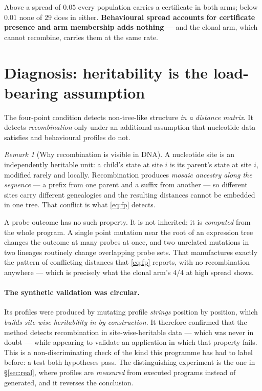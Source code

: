 \documentclass[11pt,a4paper]{article}
\theoremstyle{definition}
\theoremstyle{remark}
\newtheorem{remark}{Remark}[section]
\begin{document}
Above a spread of $0.05$ every population carries a certificate in both arms;
below $0.01$ none of $29$ does in either. \textbf{Behavioural spread accounts for
certificate presence and arm membership adds nothing} --- and the clonal arm,
which cannot recombine, carries them at the same rate.

\section{Diagnosis: heritability is the load-bearing assumption}\label{sec:diagnosis}

The four-point condition detects non-tree-like structure \emph{in a distance
matrix}. It detects \emph{recombination} only under an additional assumption that
nucleotide data satisfies and behavioural profiles do not.

\begin{remark}[Why recombination is visible in DNA]
A nucleotide site is an independently heritable unit: a child's state at site $i$
is its parent's state at site $i$, modified rarely and locally. Recombination
produces \emph{mosaic ancestry along the sequence} --- a prefix from one parent
and a suffix from another --- so different sites carry different genealogies and
the resulting distances cannot be embedded in one tree. That conflict is what
\eqref{eq:fp} detects.
\end{remark}

A probe outcome has no such property. It is not inherited; it is \emph{computed}
from the whole program. A single point mutation near the root of an expression
tree changes the outcome at many probes at once, and two unrelated mutations in
two lineages routinely change overlapping probe sets. That manufactures exactly
the pattern of conflicting distances that \eqref{eq:fp} reports, with no
recombination anywhere --- which is precisely what the clonal arm's $4/4$ at high
spread shows.

\paragraph{The synthetic validation was circular.} Its profiles were produced by
mutating profile \emph{strings} position by position, which \emph{builds
site-wise heritability in by construction}. It therefore confirmed that the
method detects recombination in site-wise-heritable data --- which was never in
doubt --- while appearing to validate an application in which that property
fails. This is a non-discriminating check of the kind this programme has had to
label before: a test both hypotheses pass. The distinguishing experiment is the
one in \S\ref{sec:real}, where profiles are \emph{measured} from executed
programs instead of generated, and it reverses the conclusion.
\end{document}
